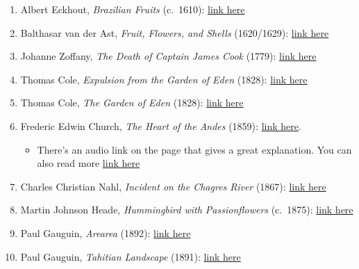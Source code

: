 \documentclass[
  12pt,
  letterpaper,
  DIV=11,
  numbers=noendperiod]{scrreprt}
\providecommand{\tightlist}{%
  \setlength{\itemsep}{0pt}\setlength{\parskip}{0pt}}
\begin{document}
\begin{enumerate}
\def\labelenumi{\arabic{enumi}.}
\setcounter{enumi}{1}
\item
  Albert Eckhout, \emph{Brazilian Fruits} (c.~1610):
  \href{https://en.wikipedia.org/wiki/File:Albert_Eckhout_1610-1666_Brazilian_fruits.jpg}{link
  here}
\item
  Balthasar van der Ast, \emph{Fruit, Flowers, and Shells} (1620/1629):
  \href{http://emuseum.toledomuseum.org/objects/55093}{link here}
\item
  Johanne Zoffany, \emph{The Death of Captain James Cook} (1779):
  \href{https://en.wikipedia.org/wiki/The_Death_of_Captain_James_Cook_(Zoffany)\#/media/File:Zoffany_Death_of_Captain_Cook.jpg}{link
  here}
\item
  Thomas Cole, \emph{Expulsion from the Garden of Eden} (1828):
  \href{https://artsandculture.google.com/asset/expulsion-from-the-garden-of-eden/IQEPipHQTghvCw?hl=en}{link
  here}
\item
  Thomas Cole, \emph{The Garden of Eden} (1828):
  \href{https://artsandculture.google.com/asset/the-garden-of-eden-thomas-cole/FwHRDrYYX_YVuw}{link
  here}
\item
  Frederic Edwin Church, \emph{The Heart of the Andes} (1859):
  \href{https://www.metmuseum.org/art/collection/search/10481}{link
  here}.

  \begin{itemize}
  \tightlist
  \item
    There's an audio link on the page that gives a great explanation.
    You can also read more
    \href{https://en.wikipedia.org/wiki/The_Heart_of_the_Andes}{link
    here}
  \end{itemize}
\item
  Charles Christian Nahl, \emph{Incident on the Chagres River} (1867):
  \href{http://imgzoom.cdlib.org/Fullscreen.ics?ark=ark:/13030/tf658010cs/z1&&brand=oac4}{link
  here}
\item
  Martin Johnson Heade, \emph{Hummingbird with Passionflowers}
  (c.~1875):
  \href{https://artsandculture.google.com/asset/hummingbird-and-passionflowers-martin-johnson-heade/LAEr7eIcfErZwg?hl=en}{link
  here}
\item
  Paul Gauguin, \emph{Arearea} (1892):
  \href{https://www.wikiart.org/en/paul-gauguin/arearea-i-1892}{link
  here}
\item
  Paul Gauguin, \emph{Tahitian Landscape} (1891):
  \href{./texts_images/paintings/gauguin_tahitian_landscape.jpeg}{link
  here}
\end{enumerate}
\end{document}
